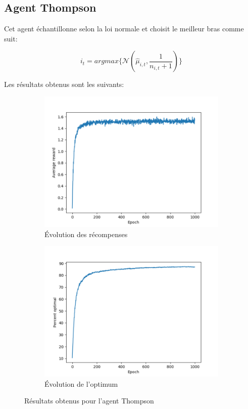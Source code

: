 \documentclass[a4paper,english,12pt]{article}
\begin{document}
\subsection{Agent Thompson}

Cet agent échantillonne selon la loi normale et choisit le meilleur bras comme suit:

$$
i_t=argmax\{\mathcal{N}(\hat{\mu}_{i,t},\frac{1}{n_{i,t}+1})\}
$$

Les résultats obtenus sont les suivants:
\begin{figure}[H]
	\centering
	\begin{subfigure}{0.48\textwidth}
		\includegraphics[width=\textwidth]{thomps_reward}
		\caption{Évolution des récompenses}
	\end{subfigure}
	\begin{subfigure}{0.48\textwidth}
		\includegraphics[width=\textwidth]{thomps_optimal}
		\caption{Évolution de l'optimum}
	\end{subfigure}
	\caption{Résultats obtenus pour l'agent Thompson}
\end{figure}
\end{document}
